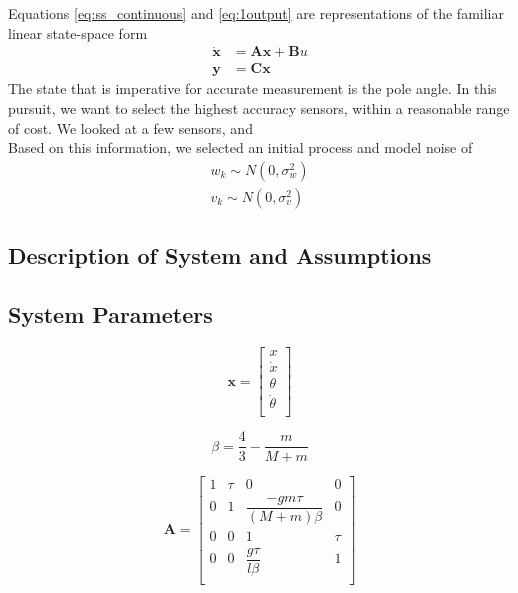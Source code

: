 \documentclass{article}
\newcommand{\matr}[1]{\bm{#1}}     %
\begin{document}
Equations \ref{eq:ss_continuous} and \ref{eq:1output} are representations of the familiar linear state-space form
\begin{equation}
\begin{aligned}
\matr{\dot{x}} &= \matr{A}\matr{x} + \matr{B}u \\
\matr{y} &= \matr{C}\matr{x}
\end{aligned}
\end{equation}
The state that is imperative for accurate measurement is the pole angle. In this pursuit, we want to select the highest accuracy sensors, within a reasonable range of cost. We looked at a few sensors, and \\

Based on this information, we selected an initial process and model noise of
\begin{equation}
\begin{aligned}
w_k \sim N(0,\sigma_w^2) \\
v_k \sim N(0,\sigma_v^2)
\end{aligned}
\end{equation}
\subsection{Description of System and Assumptions}
\subsection{System Parameters}

\begin{equation}
\matr{x} = 
\begin{bmatrix}
	x \\
	\dot{x} \\
	\theta \\
	\dot{\theta} \\
\end{bmatrix}
\label{xMatrix}
\end{equation}

\begin{equation}
\beta = \dfrac{4}{3} - \dfrac{m}{M+m}
\end{equation}

\begin{equation}
\matr{A} = 
\begin{bmatrix}
	1 & \tau & 0 & 0 \\
	0 & 1 & \dfrac{-gm\tau}{(M+m)\beta} & 0 \\
	0 & 0 & 1 & \tau \\
	0 & 0 & \dfrac{g\tau}{l\beta} & 1 \\
\end{bmatrix}
\label{aMatrix}
\end{equation}
\end{document}
